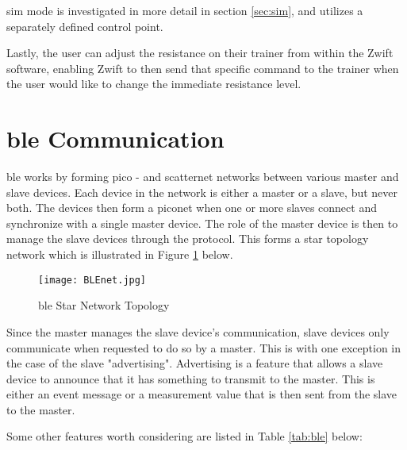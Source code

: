 \ac{sim} mode is investigated in more detail in section \ref{sec:sim}, and utilizes a separately defined control point. \cite{Zwiftinsider:2022}

Lastly, the user can adjust the resistance on their trainer from within the Zwift software, enabling Zwift to then send that specific command to the trainer when the user would like to change the immediate resistance level.

\newpage

\section{\ac{ble} Communication}
\label{sec:ble}

\ac{ble} works by forming pico - and scatternet networks between various master and slave devices. Each device in the network is either a master or a slave, but never both. The devices then form a piconet when one or more slaves connect and synchronize with a single master device. The role of the master device is then to manage the slave devices through the protocol. This forms a star topology network which is illustrated in Figure \ref{fig:ble} below.\\

\begin{figure}[H]
	\begin{center}
		\texttt{[image: BLEnet.jpg]}
		\caption{\ac{ble} Star Network Topology}
		\label{fig:ble}
	\end{center}
\end{figure}

Since the master manages the slave device's communication, slave devices only communicate when requested to do so by a master. This is with one exception in the case of the slave "advertising". Advertising is a feature that allows a slave device to announce that it has something to transmit to the master. This is either an event message or a measurement value that is then sent from the slave to the master.

Some other features worth considering are listed in Table \ref{tab:ble} below:


